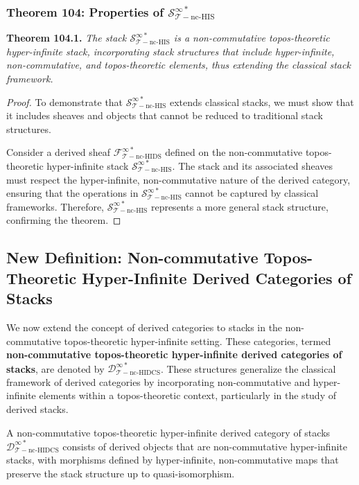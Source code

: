\documentclass{article}
\begin{document}
\subsubsection{Theorem 104: Properties of \(\mathcal{S}_{\mathcal{T}-\text{nc-HIS}}^{\infty *}\)}
\textbf{Theorem 104.1.} \textit{The stack \(\mathcal{S}_{\mathcal{T}-\text{nc-HIS}}^{\infty *}\) is a non-commutative topos-theoretic hyper-infinite stack, incorporating stack structures that include hyper-infinite, non-commutative, and topos-theoretic elements, thus extending the classical stack framework.}

\begin{proof}
To demonstrate that \(\mathcal{S}_{\mathcal{T}-\text{nc-HIS}}^{\infty *}\) extends classical stacks, we must show that it includes sheaves and objects that cannot be reduced to traditional stack structures.

Consider a derived sheaf \(\mathcal{F}_{\mathcal{T}-\text{nc-HIDS}}^{\infty *}\) defined on the non-commutative topos-theoretic hyper-infinite stack \(\mathcal{S}_{\mathcal{T}-\text{nc-HIS}}^{\infty *}\). The stack and its associated sheaves must respect the hyper-infinite, non-commutative nature of the derived category, ensuring that the operations in \(\mathcal{S}_{\mathcal{T}-\text{nc-HIS}}^{\infty *}\) cannot be captured by classical frameworks. Therefore, \(\mathcal{S}_{\mathcal{T}-\text{nc-HIS}}^{\infty *}\) represents a more general stack structure, confirming the theorem.
\end{proof}

\subsection{New Definition: Non-commutative Topos-Theoretic Hyper-Infinite Derived Categories of Stacks}
We now extend the concept of derived categories to stacks in the non-commutative topos-theoretic hyper-infinite setting. These categories, termed \textbf{non-commutative topos-theoretic hyper-infinite derived categories of stacks}, are denoted by \(\mathcal{D}_{\mathcal{T}-\text{nc-HIDCS}}^{\infty *}\). These structures generalize the classical framework of derived categories by incorporating non-commutative and hyper-infinite elements within a topos-theoretic context, particularly in the study of derived stacks.

A non-commutative topos-theoretic hyper-infinite derived category of stacks \(\mathcal{D}_{\mathcal{T}-\text{nc-HIDCS}}^{\infty *}\) consists of derived objects that are non-commutative hyper-infinite stacks, with morphisms defined by hyper-infinite, non-commutative maps that preserve the stack structure up to quasi-isomorphism.
\end{document}

